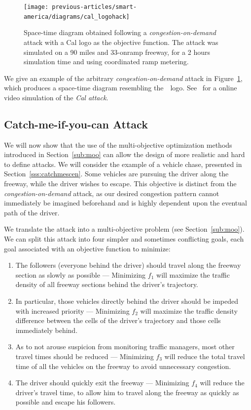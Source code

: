 \begin{figure}[ht]
\centering
  \texttt{[image: previous-articles/smart-america/diagrams/cal\_logohack]}
\caption{Space-time diagram obtained following a \emph{congestion-on-demand} attack with a Cal logo as the objective function. The attack was simulated on a 90 miles and 33-onramp freeway, for a 2 hours simulation time and using coordinated ramp metering.}
\label{fig:cal_logo}
\end{figure}

We give an example of the arbitrary \emph{congestion-on-demand} attack in Figure~\ref{fig:cal_logo}, which produces a space-time diagram resembling the~~logo. See~\cite{smartroadswebsite} for a online video simulation of the \emph{Cal attack}.

\subsection{Catch-me-if-you-can Attack}
\label{sub:catchme}
We will now show that the use of the multi-objective optimization methods introduced in Section~\ref{sub:moo} can allow the design of more realistic and hard to define attacks. We will consider the example of a vehicle chase, presented in Section~\ref{sss:catchmescen}. Some vehicles are pursuing the driver along the freeway, while the driver wishes to escape. This objective is distinct from the \emph{congestion-on-demand} attack, as our desired congestion pattern cannot immediately be imagined beforehand and is highly dependent upon the eventual path of the driver.

We translate the attack into a multi-objective problem (see Section~\ref{sub:moo}). We can split this attack into four simpler and sometimes conflicting goals, each goal associated with an objective function to minimize:

\begin{enumerate}
\item The followers (everyone behind the driver) should travel along the freeway section as slowly as possible --- Minimizing $f_1$ will maximize the traffic density of all freeway sections behind the driver's trajectory.

\item In particular, those vehicles directly behind the driver should be impeded with increased priority --- Minimizing $f_2$ will maximize the traffic density difference between the cells of the driver's trajectory and those cells immediately behind.
\item As to not arouse suspicion from monitoring traffic managers, most other travel times should be reduced --- Minimizing $f_3$ will reduce the total travel time of all the vehicles on the freeway to avoid unnecessary congestion.
\item The driver should quickly exit the freeway --- Minimizing $f_4$ will reduce the driver's travel time, to allow him to travel along the freeway as quickly as possible and escape his followers.
\end{enumerate}


